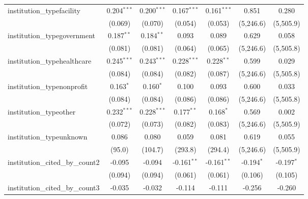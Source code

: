 \begin{tabular}{lcccccc}
   institution\_typefacility             & 0.204$^{***}$ & 0.200$^{***}$ & 0.167$^{***}$ & 0.161$^{***}$ & 0.851         & 0.280\\   
                                         & (0.069)       & (0.070)       & (0.054)       & (0.053)       & (5,246.6)     & (5,505.9)\\   
   institution\_typegovernment           & 0.187$^{**}$  & 0.184$^{**}$  & 0.093         & 0.089         & 0.629         & 0.058\\   
                                         & (0.081)       & (0.081)       & (0.064)       & (0.065)       & (5,246.6)     & (5,505.8)\\   
   institution\_typehealthcare           & 0.245$^{***}$ & 0.243$^{***}$ & 0.228$^{***}$ & 0.228$^{**}$  & 0.599         & 0.029\\   
                                         & (0.084)       & (0.084)       & (0.082)       & (0.087)       & (5,246.6)     & (5,505.8)\\   
   institution\_typenonprofit            & 0.163$^{*}$   & 0.160$^{*}$   & 0.100         & 0.093         & 0.600         & 0.033\\   
                                         & (0.084)       & (0.084)       & (0.086)       & (0.086)       & (5,246.6)     & (5,505.8)\\   
   institution\_typeother                & 0.232$^{***}$ & 0.228$^{***}$ & 0.177$^{**}$  & 0.168$^{*}$   & 0.569         & 0.002\\   
                                         & (0.072)       & (0.073)       & (0.082)       & (0.083)       & (5,246.6)     & (5,505.9)\\   
   institution\_typeunknown              & 0.086         & 0.080         & 0.059         & 0.081         & 0.619         & 0.055\\   
                                         & (95.0)        & (104.7)       & (293.8)       & (294.4)       & (5,246.6)     & (5,505.9)\\   
   institution\_cited\_by\_count2        & -0.095        & -0.094        & -0.161$^{**}$ & -0.161$^{**}$ & -0.194$^{*}$  & -0.197$^{*}$\\   
                                         & (0.094)       & (0.094)       & (0.061)       & (0.061)       & (0.106)       & (0.105)\\   
   institution\_cited\_by\_count3        & -0.035        & -0.032        & -0.114        & -0.111        & -0.256        & -0.260\\   

\end{tabular}
